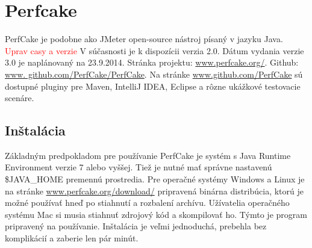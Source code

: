 \documentclass[12pt,oneside,final]{fithesis-utf8}
\newcommand\todo[1]{\textcolor{red}{#1}}
\begin{document}
\newpage
\section{Perfcake}
PerfCake je podobne ako JMeter open-source nástroj písaný v jazyku Java. \todo{Uprav casy a verzie} V súčasnosti je k dispozícii verzia 2.0. Dátum vydania verzie 3.0 je naplánovaný na 23.9.2014. Stránka projektu: \url{www.perfcake.org/}. Github: \url{www.	github.com/PerfCake/PerfCake}. Na stránke \url{www.github.com/PerfCake} sú dostupné pluginy pre Maven, IntelliJ IDEA, Eclipse a rôzne ukážkové testovacie scenáre. 

\subsection{Inštalácia}
Základným predpokladom pre používanie PerfCake je systém s Java Runtime Environment verzie 7 alebo vyššej. Tiež je nutné mať správne nastavenú \$JAVA\_{}HOME premennú prostredia. Pre operačné systémy Windows a Linux je na stránke \url{www.perfcake.org/download/} pripravená binárna distribúcia, ktorú je možné používať hneď po stiahnutí a rozbalení archívu. Užívatelia operačného systému Mac si musia stiahnuť zdrojový kód a skompilovať ho. Týmto je program pripravený na používanie. Inštalácia je veľmi jednoduchá, prebehla bez komplikácií a zaberie len pár minút.
\end{document}
